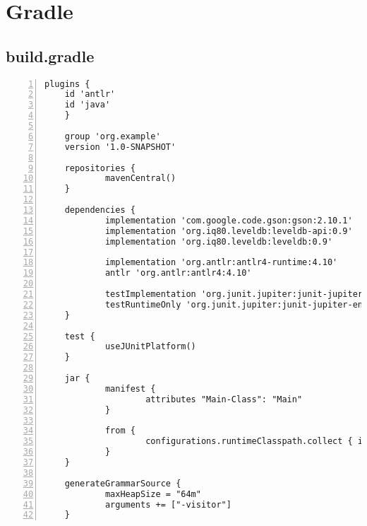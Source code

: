 
\chapter{Gradle}
\label{app:gradle}

\section{build.gradle}
\begin{Verbatim}[numbers=left,xleftmargin=1cm,firstnumber=1,breaklines=true,tabsize=2]
	plugins {
  	id 'antlr'
    id 'java'
	}

	group 'org.example'
	version '1.0-SNAPSHOT'

	repositories {
			mavenCentral()
	}

	dependencies {
			implementation 'com.google.code.gson:gson:2.10.1'
			implementation 'org.iq80.leveldb:leveldb-api:0.9'
			implementation 'org.iq80.leveldb:leveldb:0.9'

			implementation 'org.antlr:antlr4-runtime:4.10'
			antlr 'org.antlr:antlr4:4.10'

			testImplementation 'org.junit.jupiter:junit-jupiter-api:5.8.1'
			testRuntimeOnly 'org.junit.jupiter:junit-jupiter-engine:5.8.1'
	}

	test {
			useJUnitPlatform()
	}

	jar {
			manifest {
					attributes "Main-Class": "Main"
			}

			from {
					configurations.runtimeClasspath.collect { it.isDirectory() ? it : zipTree(it) }
			}
	}

	generateGrammarSource {
			maxHeapSize = "64m"
			arguments += ["-visitor"]
	}
\end{Verbatim}
